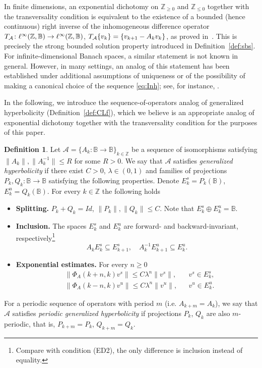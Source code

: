 \documentclass[12pt]{article}
\newcommand{\Bb}{\mathbb{B}}
\newcommand{\Zz}{\mathbb{Z}}
\theoremstyle{definition}
\newtheorem{defin}[thm]{Definition}
\begin{document}
In finite dimensions, an exponential dichotomy on
$\mathbb Z_{\ge 0}$ and $\mathbb Z_{\le 0}$ together with the transversality
condition is equivalent to the existence of a bounded (hence continuous)
right inverse of the inhomogeneous difference operator
$T_{\cal A}\colon\ell^\infty(\mathbb Z,\Bb)\to\ell^\infty(\mathbb Z,\Bb)$,
$T_{\cal A}\{v_k\}=\{v_{k+1}-A_k v_k\}$, as proved in~\cite{Pli77, Coppel}.  This is precisely the
strong bounded solution property introduced in Definition~\ref{def:sbs}.  
For infinite-dimensional Banach spaces, a similar statement is not known in general. However, in many settings, an analog of this statement has been established under additional assumptions of uniqueness or of the possibility of making a canonical choice of the sequence \eqref{eq:Inh}; see, for instance, \cite{LRS-JDDE1998, SellYou, HuyMinhCMAA2001}.

In the following, we introduce the sequence-of-operators analog of generalized hyperbolicity (Definition~\ref{def:CLf}), which we believe is an appropriate analog of exponential dichotomy together with the transversality condition for the purposes of this paper.
\begin{defin}\label{def:CLAk}
    Let $\mathcal{A} = \{A_k: \Bb \to \Bb\}_{k \in \Zz}$ be a sequence of isomorphisms satisfying $\|A_k\|, \|A^{-1}_k\| \leq R$ for some $R>0$. We say that $\mathcal{A}$ satisfies \textit{generalized hyperbolicity} if there exist $C > 0$, $\lambda \in (0, 1)$ and  families of projections $P_k, Q_k: \Bb \to \Bb$ satisfying the following properties. Denote $E^s_k = P_k(\Bb)$, $E^u_k = Q_k(\Bb)$. For every $k \in \Zz$ the following holds
\begin{itemize}
    \item[(GH1*)] \textbf{Splitting.} $P_k + Q_k = Id$, $\|P_k\|, \|Q_k\| \leq C$. Note that $E^s_k \oplus E^u_k = \Bb$.
    \item[(GH2*)] \textbf{Inclusion.} The spaces $E^s_k$ and $E^u_k$ are forward- and backward-invariant, respectively\footnote{Compare with condition (ED2), the only difference is inclusion instead of equality.}
    $$
    A_kE^s_k \subseteq E^s_{k+1}, \quad A_k^{-1}E^u_{k+1} \subseteq E^u_{k}.
    $$
    \item[(GH3*)] 

    \textbf{Exponential estimates.}  For every $n\ge 0$    
          \begin{align*}
             &\|\Phi_A(k+n, k)  v^s\|\le C\lambda^n\|v^s\|,
               && v^s\in E^s_k, \\
             &\|\Phi_A(k-n, k) v^u\|\le C\lambda^n\|v^u\|,
               && v^u\in E^u_k.
          \end{align*}
\end{itemize}
    For a periodic sequence of operators with period $m$ (i.e. $A_{k+m} = A_k$), we say that $\mathcal{A}$ satisfies \textit{periodic generalized hyperbolicity} if projections $P_k$, $Q_k$ are also $m$-periodic, that is, $P_{k+m} = P_k$, $Q_{k+m} = Q_k$.
\end{defin}
\end{document}
